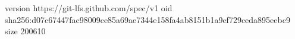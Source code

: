 version https://git-lfs.github.com/spec/v1
oid sha256:d07c67447fac98009ce85a69ae7344e158fa4ab8151b1a9ef729ceda895eebc9
size 200610

